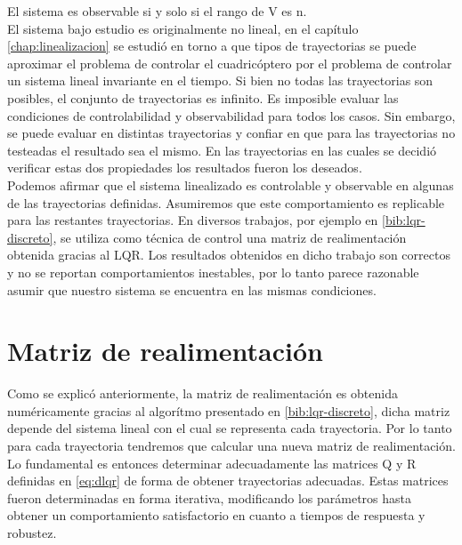 \documentclass[main]{subfiles}
\begin{document}
El sistema es observable si y solo si el rango de V es n.\\

El sistema bajo estudio es originalmente no lineal, en el cap\'itulo \ref{chap:linealizacion} se estudi\'o en torno a que tipos de trayectorias se puede aproximar el problema de controlar el cuadric\'optero por el problema de controlar un sistema lineal invariante en el tiempo. Si bien no todas las trayectorias son posibles, el conjunto de trayectorias es infinito. Es imposible evaluar las condiciones de controlabilidad y observabilidad para todos los casos. Sin embargo, se puede evaluar en distintas trayectorias y confiar en que para las trayectorias no testeadas el resultado sea el mismo. En las trayectorias en las cuales se decidi\'o verificar estas dos propiedades los resultados fueron los deseados.\\

Podemos afirmar que el sistema linealizado es controlable y observable en algunas de las trayectorias definidas. Asumiremos que este comportamiento es replicable para las restantes trayectorias. En diversos trabajos, por ejemplo en \ref{bib:lqr-discreto}, se utiliza como t\'ecnica de control una matriz de realimentaci\'on obtenida gracias al LQR. Los resultados obtenidos en dicho trabajo son correctos y no se reportan comportamientos inestables, por lo tanto parece razonable asumir que nuestro sistema se encuentra en las mismas condiciones.   

\section{Matriz de realimentaci\'on}

Como se explic\'o anteriormente, la matriz de realimentaci\'on es obtenida num\'ericamente gracias al algor\'itmo presentado en \ref{bib:lqr-discreto}, dicha matriz depende del sistema lineal con el cual se representa cada trayectoria. Por lo tanto para cada trayectoria tendremos que calcular una nueva matriz de realimentaci\'on. Lo fundamental es entonces determinar adecuadamente las matrices Q y R definidas en \ref{eq:dlqr} de forma de obtener trayectorias adecuadas. Estas matrices fueron determinadas en forma iterativa, modificando los par\'ametros hasta obtener un comportamiento satisfactorio en cuanto a tiempos de respuesta y robustez.\\
\end{document}
